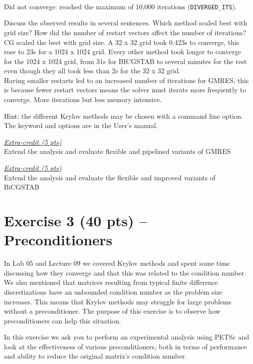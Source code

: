 \documentclass[letterpaper]{article}
\begin{document}
\begin{table}[h!]
    \vspace{4pt}
    {\footnotesize \textsuperscript{\dag}Did not converge: reached the maximum of 10,000 iterations (\texttt{DIVERGED\_ITS}).}
\end{table}


Discuss the observed results in several sentences.
Which method scaled best with grid size?
How did the number of restart vectors affect the number of iterations? \\

CG scaled the best with grid size. A 32 x 32 grid took 0.423s to converge, this rose to 23s for a 1024 x 1024 grid. Every other method took longer to converge for the 1024 x 1024 grid, from 31s for BICGSTAB to several minutes for the rest even though they all took less than 2s for the 32 x 32 grid. \\
Having smaller restarts led to an increased number of iterations for GMRES, this is because fewer restart vectors means the solver must iterate more frequently to converge. More iterations but less memory intensive.

Hint: the different Krylov methods may be chosen with a command line option.
The keyword and options are in the User's manual.

\underline{\textit{Extra-credit (5 pts)}}\\
Extend the analysis and evaluate flexible and pipelined variants of GMRES

\underline{\textit{Extra-credit (5 pts)}}\\
Extend the analysis and evaluate the flexible and improved variants of BiCGSTAB

\clearpage
\section*{Exercise 3 (40 pts) -- Preconditioners}
In Lab 05 and Lecture 09 we covered Krylov methods and spent some time discussing how they converge and that this was related to the condition number.
We also mentioned that matrices resulting from typical finite difference discretizations have an unbounded condition number as the problem size increases.
This means that Krylov methods may struggle for large problems without a preconditioner.
The purpose of this exercise is to observe how preconditioners can help this situation.

In this exercise we ask you to perform an experimental analysis using PETSc and look at the effectiveness of various preconditioners, both in terms of performance and ability to reduce the original matrix’s condition number.
\end{document}
